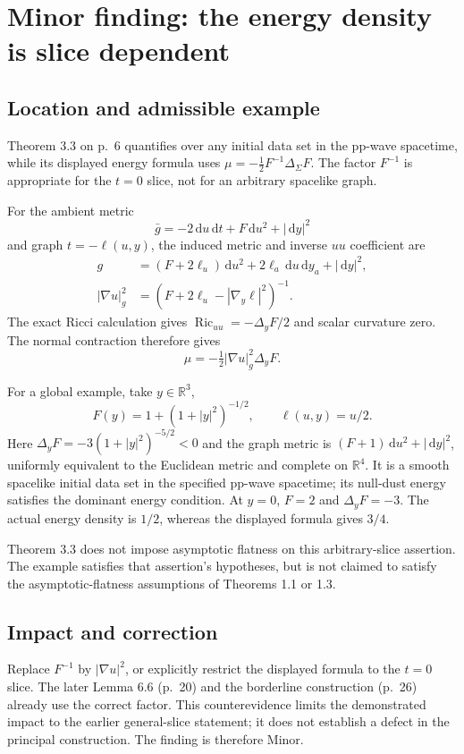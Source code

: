\documentclass[10pt]{article}
\begin{document}
\section*{Minor finding: the energy density is slice dependent}
\subsection*{Location and admissible example}
Theorem 3.3 on p. 6 quantifies over any initial data set in the pp-wave spacetime, while its displayed energy formula uses \(\mu=-\tfrac12F^{-1}\Delta_\Sigma F\). The factor \(F^{-1}\) is appropriate for the \(t=0\) slice, not for an arbitrary spacelike graph.\par
For the ambient metric \[\bar g=-2\,\mathrm du\,\mathrm dt+F\,\mathrm du^2+|\,\mathrm dy|^2\] and graph \(t=-\ell(u,y)\), the induced metric and inverse \(uu\) coefficient are \[\begin{aligned}
 g&=(F+2\ell_u)\,\mathrm du^2+2\ell_a\,\mathrm du\,\mathrm dy_a+|\,\mathrm dy|^2,\\
 |\nabla u|_g^2&=(F+2\ell_u-|\nabla_y\ell|^2)^{-1}.\end{aligned}\] The exact Ricci calculation gives \(\operatorname{Ric}_{uu}=-\Delta_yF/2\) and scalar curvature zero. The normal contraction therefore gives \[\mu=-\tfrac12|\nabla u|_g^2\Delta_yF.\]\par
For a global example, take \(y\in\mathbb R^3\), \[F(y)=1+(1+|y|^2)^{-1/2},\qquad \ell(u,y)=u/2 .\] Here \(\Delta_yF=-3(1+|y|^2)^{-5/2}<0\) and the graph metric is \((F+1)\,\mathrm du^2+|\,\mathrm dy|^2\), uniformly equivalent to the Euclidean metric and complete on \(\mathbb R^4\). It is a smooth spacelike initial data set in the specified pp-wave spacetime; its null-dust energy satisfies the dominant energy condition. At \(y=0\), \(F=2\) and \(\Delta_yF=-3\). The actual energy density is \(1/2\), whereas the displayed formula gives \(3/4\).\par
Theorem 3.3 does not impose asymptotic flatness on this arbitrary-slice assertion. The example satisfies that assertion’s hypotheses, but is not claimed to satisfy the asymptotic-flatness assumptions of Theorems 1.1 or 1.3.\par
\subsection*{Impact and correction}
Replace \(F^{-1}\) by \(|\nabla u|^2\), or explicitly restrict the displayed formula to the \(t=0\) slice. The later Lemma 6.6 (p. 20) and the borderline construction (p. 26) already use the correct factor. This counterevidence limits the demonstrated impact to the earlier general-slice statement; it does not establish a defect in the principal construction. The finding is therefore Minor.\par
\end{document}
